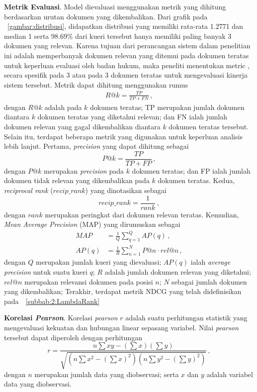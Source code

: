 \vspace{2mm}
\noindent{}\textbf{Metrik Evaluasi}.
\label{bagian:Metrik Evaluasi}
Model dievaluasi menggunakan metrik yang dihitung berdasarkan urutan dokumen yang dikembalikan. Dari grafik pada \gambar{}~\ref{gambar:distribusi}, didapatkan distribusi yang memiliki rata-rata 1.2771 dan median 1 serta 98.69\% dari kueri tersebut hanya memiliki paling banyak 3 dokumen yang relevan. Karena tujuan dari perancangan sistem \ir{} dalam penelitian ini adalah memperbanyak dokumen relevan yang ditemui pada dokumen teratas untuk keperluan evaluasi oleh badan hukum, maka peneliti menentukan metric \recall{}, secara spesifik pada \cutoff{} 3 atau pada 3 dokumen teratas untuk mengevaluasi kinerja sistem tersebut. Metrik \recall{} dapat dihitung menggunakan rumus
\begin{align*}
    R@k=\frac{TP}{TP+FN} \, ,
\end{align*}
dengan \(R@k\) adalah \recall{} pada \(k\) dokumen teratas; TP merupakan jumlah dokumen diantara $k$ dokumen teratas yang diketahui relevan; dan FN ialah jumlah dokumen relevan yang gagal dikembalikan diantara \(k\) dokumen teratas tersebut. Selain itu, terdapat beberapa metrik yang digunakan untuk keperluan analisis lebih lanjut. Pertama, \textit{precision} yang dapat dihitung sebagai
\[
P@k=\frac{TP}{TP+FP} \, ,
\]
dengan $P@k$ merupakan \textit{precision} pada $k$ dokumen teratas; dan FP ialah jumlah dokumen tidak relevan yang dikembalikan pada $k$ dokumen teratas. Kedua, \textit{reciprocal rank} ($recip\_rank$) yang dinotasikan sebagai
\[
recip\_rank=\frac{1}{rank} \, ,
\]
dengan $rank$ merupakan peringkat dari dokumen relevan teratas. Kemudian, \textit{Mean Average Precision} (MAP) yang dirumuskan sebagai
\begin{align*}
    MAP&=\frac{1}{Q} \sum_{q=1}^Q AP(q) \, ,\\
    AP(q)&=\frac{1}{R} \sum_{n=1}^N P@n \cdot rel@n \, ,
\end{align*}
dengan $Q$ merupakan jumlah kueri yang dievaluasi; $AP(q)$ ialah \textit{average precision} untuk suatu kueri $q$; $R$ adalah jumlah dokumen relevan yang diketahui; $rel@n$ merupakan relevansi dokumen pada posisi $n$; $N$ sebagai jumlah dokumen yang dikembalikan;  Terakhir, terdapat metrik NDCG yang telah didefinisikan pada~\subbab{}~\ref{subbab:2:LambdaRank}

\vspace{2mm}
\noindent{}\textbf{Korelasi \textit{Pearson}}.
\label{bagian:Korelasi Pearson}
Korelasi \textit{pearson} $r$ adalah suatu perhitungan statistik yang mengevaluasi kekuatan dan hubungan linear sepasang variabel. Nilai \textit{pearson} tersebut dapat diperoleh dengan perhitungan
\[
r=\frac{n\sum{}xy-(\sum{}x)(\sum{}y)}{\sqrt{(n\sum{}x^2-(\sum{}x)^2)(n\sum{}y^2-(\sum{}y)^2)}} \, ,
\]
dengan $n$ merupakan jumlah data yang diobservasi; serta $x$ dan $y$ adalah variabel data yang diobservasi.

